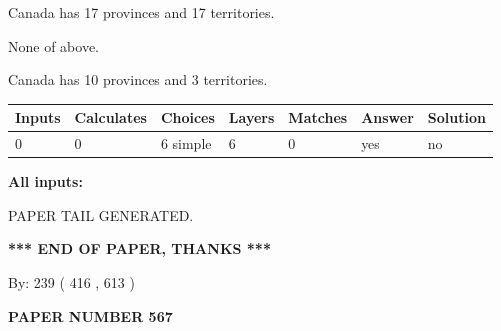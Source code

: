 \documentclass[12pt]{article}
\begin{document}
 
Canada has  17 provinces and  17 territories.
 
 
 None of above.
 
 
\noindent{}
 
 
Canada has 10  provinces and 3 territories.
 
 
\noindent{}
 
 
   
   
   
   
\noindent\begin{tabular}{|l|l|l|l|l|l|l|}
 \hline
Inputs & Calculates & Choices & Layers & Matches & Answer & Solution \\ \hline
 0  & 
 0  & 
 6
  simple  
  & 
 6  & 
 0  & 
  yes & 
  no 
  \\ \hline
 \end{tabular}
   
   
   
   
\noindent{}
   
   
   
   
\noindent\vspace{0.1in}\hspace{-0.08in} {\textbf{\Large{All inputs: }}}
   
   
   
   
   
   
 \vspace{0.2in}
 
   
   
\vspace{2.0in} PAPER TAIL GENERATED.
   
   
   
   
\vspace{1.0in} 
{\textbf{\large{ *** END OF PAPER, THANKS *** }}} 
   
   
\hspace{1.0in} By: 
 239 ( 416 ,  613 )
   
   
   
   
\newpage 
\setcounter{page}{ 
   567001 } 
   
   
   
   
 {\textbf{ \Large{ PAPER NUMBER  567  }}}
   
\end{document}
